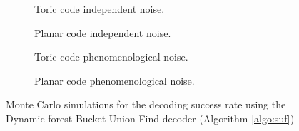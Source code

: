 \begin{figure}[htbp]
  \centering
  \begin{subfigure}[b]{0.49\textwidth}
      \begin{adjustbox}{Clip=0 1em 0 0}
        
      \end{adjustbox}
      \caption{Toric code independent noise.}
  \end{subfigure}
  \begin{subfigure}[b]{0.49\textwidth}
      \begin{adjustbox}{Clip=0 1em 0 0}
        
      \end{adjustbox}
      \caption{Planar code independent noise.}
  \end{subfigure}
  \begin{subfigure}[b]{0.49\textwidth}
      \begin{adjustbox}{Clip=0 1em 0 0}
        
      \end{adjustbox}
      \caption{Toric code phenomenological noise.}
  \end{subfigure}
  \begin{subfigure}[b]{0.49\textwidth}
      \begin{adjustbox}{Clip=0 1em 0 0}
        
      \end{adjustbox}
      \caption{Planar code phenomenological noise.}
  \end{subfigure}
  \caption{Monte Carlo simulations for the decoding success rate using the Dynamic-forest Bucket Union-Find decoder (Algorithm \ref{algo:suf})}
  \label{fig:threshold_dbuf}
\end{figure}

